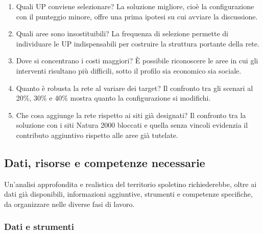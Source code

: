 \documentclass[
  a4paper,
]{book}
\providecommand{\tightlist}{%
  \setlength{\itemsep}{0pt}\setlength{\parskip}{0pt}}
\begin{document}
\begin{enumerate}
\def\labelenumi{\arabic{enumi}.}
\tightlist
\item
  Quali UP conviene selezionare? La soluzione migliore, cioè la configurazione con il punteggio minore, offre una prima ipotesi su cui avviare la discussione.
\item
  Quali aree sono insostituibili? La frequenza di selezione permette di individuare le UP indispensabili per costruire la struttura portante della rete.
\item
  Dove si concentrano i costi maggiori? È possibile riconoscere le aree in cui gli interventi risultano più difficili, sotto il profilo sia economico sia sociale.
\item
  Quanto è robusta la rete al variare dei target? Il confronto tra gli scenari al 20\%, 30\% e 40\% mostra quanto la configurazione si modifichi.
\item
  Che cosa aggiunge la rete rispetto ai siti già designati? Il confronto tra la soluzione con i siti Natura 2000 bloccati e quella senza vincoli evidenzia il contributo aggiuntivo rispetto alle aree già tutelate.
\end{enumerate}

\subsection{Dati, risorse e competenze necessarie}\label{dati-risorse-e-competenze-necessarie}

Un'analisi approfondita e realistica del territorio spoletino richiederebbe, oltre ai dati già disponibili, informazioni aggiuntive, strumenti e competenze specifiche, da organizzare nelle diverse fasi di lavoro.

\subsubsection{Dati e strumenti}\label{dati-e-strumenti}
\end{document}
